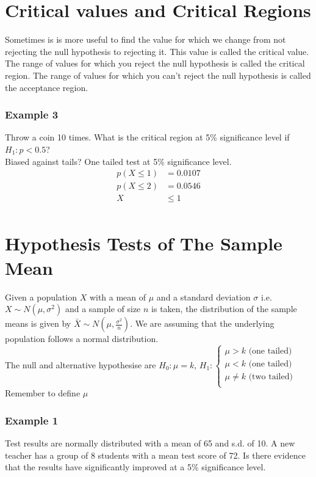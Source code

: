 \documentclass[a4paper,12pt]{article}
\begin{document}
\section*{Critical values and Critical Regions}
Sometimes is is more useful to find the value for which we change from not rejecting the null hypothesis to rejecting it. This value is called the critical value. \\
The range of values for which you reject the null hypothesis is called the critical region. The range of values for which you can't reject the null hypothesis is called the acceptance region. 
\subsubsection*{Example 3}
Throw a coin 10 times. What is the critical region at 5\% significance level if $H_1: p < 0.5$? \\
Biased against tails?
One tailed test at 5\% significance level.
\begin{align*}
p(X \leqslant 1) & = 0.0107 \\
p(X \leqslant 2) & = 0.0546 \\
X & \leqslant 1 \\
\end{align*}
\section*{Hypothesis Tests of The Sample Mean}
Given a population $X$ with a mean of $\mu$ and a standard deviation $\sigma$ i.e. $X \sim N(\mu, \sigma^2)$ and a sample of size $n$ is taken, the distribution of the sample means is given by $\bar{X} \sim N(\mu, \frac{\sigma^2}{n})$. We are assuming that the underlying population follows a normal distribution. \\

The null and alternative hypothesise are $H_0: \mu = k$, $H_1: \begin{cases} \mu > k \text{ (one tailed)} \\ \mu < k \text{ (one tailed)} \\ \mu \neq k \text{ (two tailed)} \\ \end{cases}$\\

Remember to define $\mu$
\subsubsection*{Example 1}
Test results are normally distributed with a mean of 65 and s.d. of 10. A new teacher has a group of 8 students with a mean test score of 72. Is there evidence that the results have significantly improved at a 5\% significance level. \\
\end{document}
